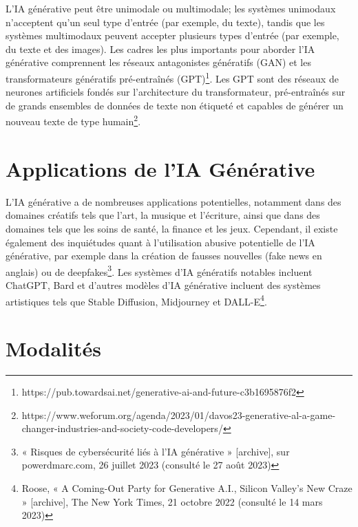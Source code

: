 \documentclass[12pt,a4paper]{article}
\begin{document}
L'IA générative peut être unimodale ou multimodale; les systèmes unimodaux n'acceptent qu'un seul type d'entrée (par exemple, du texte), tandis que les systèmes multimodaux peuvent accepter plusieurs types d'entrée (par exemple, du texte et des images). Les cadres les plus importants pour aborder l'IA générative comprennent les réseaux antagonistes génératifs (GAN) et les transformateurs génératifs pré-entraînés (GPT)\footnote{https://pub.towardsai.net/generative-ai-and-future-c3b1695876f2}. Les GPT sont des réseaux de neurones artificiels fondés sur l'architecture du transformateur, pré-entraînés sur de grands ensembles de données de texte non étiqueté et capables de générer un nouveau texte de type humain\footnote{https://www.weforum.org/agenda/2023/01/davos23-generative-al-a-game-changer-industries-and-society-code-developers/}.

\section{Applications de l'IA Générative}

L'IA générative a de nombreuses applications potentielles, notamment dans des domaines créatifs tels que l'art, la musique et l'écriture, ainsi que dans des domaines tels que les soins de santé, la finance et les jeux. Cependant, il existe également des inquiétudes quant à l'utilisation abusive potentielle de l'IA générative, par exemple dans la création de fausses nouvelles (fake news en anglais) ou de deepfakes\footnote{« Risques de cybersécurité liés à l'IA générative » [archive], sur powerdmarc.com, 26 juillet 2023 (consulté le 27 août 2023)}. Les systèmes d'IA génératifs notables incluent ChatGPT, Bard et d'autres modèles d'IA générative incluent des systèmes artistiques tels que Stable Diffusion, Midjourney et DALL-E\footnote{Roose, « A Coming-Out Party for Generative A.I., Silicon Valley's New Craze » [archive], The New York Times, 21 octobre 2022 (consulté le 14 mars 2023)}.

\section{Modalités}
\end{document}
